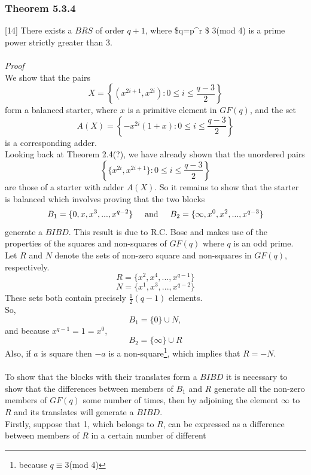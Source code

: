 \documentclass[
  12pt,
  a4paper]{book}
\begin{document}
\hypertarget{theorem-5.3.4}{%
\subsubsection{Theorem 5.3.4}\label{theorem-5.3.4}}

{[}14{]} There exists a \(BRS\) of order \(q+1\), where \$q=p\^{}r
\equiv \$ 3(mod 4) is a prime power strictly greater than 3.\\
~\\
\emph{Proof}\\
We show that the pairs
\[X = \left \{(x^{2i+1},x^{2i}): 0 \leq i \leq \frac{q-3}{2} \right \}\]
form a balanced starter, where \(x\) is a primitive element in
\(GF(q)\), and the set
\[A(X) = \left \{-x^{2i}(1+x): 0 \leq i \leq \frac{q-3}{2} \right \}\]
is a corresponding adder.\\
Looking back at Theorem 2.4(?), we have already shown that the unordered
pairs
\[\left \{\{x^{2i},x^{2i+1}\}: 0 \leq i \leq \frac{q-3}{2} \right \}\]
are those of a starter with adder \(A(X)\). So it remains to show that
the starter is balanced which involves proving that the two blocks
\[B_1 = \{0,x,x^3,...,x^{q-2}\} \hspace{0.5cm} \mathrm{and} \hspace{0.5cm} B_2 = \{\infty,x^0,x^2,...,x^{q-3}\}\]
generate a \(BIBD\). This result is due to R.C. Bose and makes use of
the properties of the squares and non-squares of \(GF(q)\) where \(q\)
is an odd prime.\\
Let \(R\) and \(N\) denote the sets of non-zero square and non-squares
in \(GF(q)\), respectively. \[R=\{x^2,x^4,...,x^{q-1}\}\]
\[N=\{x^1,x^3,...,x^{q-2}\}\] These sets both contain precisely
\(\frac{1}{2}(q-1)\) elements.\\
So, \[B_1 = \{0\} \cup N,\] and because \(x^{q-1} = 1 = x^0\),\\
\[B_2 = \{\infty\} \cup R\] Also, if \(a\) is square then \(-a\) is a
non-square\footnote{because \(q \equiv 3\)(mod 4)}, which implies that
\(R=-N\).\\
~\\
To show that the blocks with their translates form a \(BIBD\) it is
necessary to show that the differences between members of \(B_1\) and
\(R\) generate all the non-zero members of \(GF(q)\) some number of
times, then by adjoining the element \(\infty\) to \(R\) and its
translates will generate a \(BIBD\).\\
Firstly, suppose that 1, which belongs to \(R\), can be expressed as a
difference between members of \(R\) in a certain number of different
\end{document}
